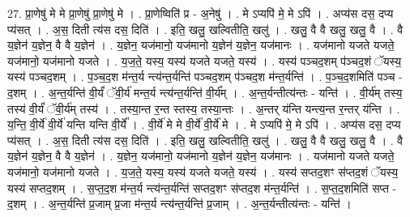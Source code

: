 \documentclass[17pt]{extarticle}
\begin{document}
27. प्रा॒णेषु॑ मे मे प्रा॒णेषु॑ प्रा॒णेषु॑ मे । . प्रा॒णेष्विति॑ प्र - अ॒नेषु॑ । . मे ऽप्यपि॑ मे॒ मे ऽपि॑ । . अप्य॑स दस॒ दप्य प्य॑सत् । . अ॒स॒ दिती त्य॑स दस॒ दिति॑ । . इति॒ खलु॒ खल्वितीति॒ खलु॑ । . खलु॒ वै वै खलु॒ खलु॒ वै । . वै य॒ज्ञेन॑ य॒ज्ञेन॒ वै वै य॒ज्ञेन॑ । . य॒ज्ञेन॒ यज॑मानो॒ यज॑मानो य॒ज्ञेन॑ य॒ज्ञेन॒ यज॑मानः । . यज॑मानो यजते यजते॒ यज॑मानो॒ यज॑मानो यजते । . य॒ज॒ते॒ यस्य॒ यस्य॑ यजते यजते॒ यस्य॑ । . यस्य॑ पञ्चद॒शम् प॑ञ्चद॒शं ॅयस्य॒ यस्य॑ पञ्चद॒शम् । . प॒ञ्च॒द॒श म॑न्त॒र्य न्त्य॑न्त॒र्यन्ति॑ पञ्चद॒शम् प॑ञ्चद॒श म॑न्त॒र्यन्ति॑ । . प॒ञ्च॒द॒शमिति॑ पञ्च - द॒शम् । . अ॒न्त॒र्यन्ति॑ वी॒र्यं॑ ॅवी॒र्य॑ मन्त॒र्य न्त्य॑न्त॒र्यन्ति॑ वी॒र्य᳚म् । . अ॒न्त॒र्यन्तीत्य॑न्तः - यन्ति॑ । . वी॒र्य॑म् तस्य॒ तस्य॑ वी॒र्यं॑ ॅवी॒र्य॑म् तस्य॑ । . तस्या॒न्त र॒न्त स्तस्य॒ तस्या॒न्तः । . अ॒न्तर् य॑न्ति यन्त्य॒न्त र॒न्तर् य॑न्ति । . य॒न्ति॒ वी॒र्ये॑ वी॒र्ये॑ यन्ति यन्ति वी॒र्ये᳚ । . वी॒र्ये॑ मे मे वी॒र्ये॑ वी॒र्ये॑ मे । . मे ऽप्यपि॑ मे॒ मे ऽपि॑ । . अप्य॑स दस॒ दप्य प्य॑सत् । . अ॒स॒ दिती त्य॑स दस॒ दिति॑ । . इति॒ खलु॒ खल्वितीति॒ खलु॑ । . खलु॒ वै वै खलु॒ खलु॒ वै । . वै य॒ज्ञेन॑ य॒ज्ञेन॒ वै वै य॒ज्ञेन॑ । . य॒ज्ञेन॒ यज॑मानो॒ यज॑मानो य॒ज्ञेन॑ य॒ज्ञेन॒ यज॑मानः । . यज॑मानो यजते यजते॒ यज॑मानो॒ यज॑मानो यजते । . य॒ज॒ते॒ यस्य॒ यस्य॑ यजते यजते॒ यस्य॑ । . यस्य॑ सप्तद॒शꣳ स॑प्तद॒शं ॅयस्य॒ यस्य॑ सप्तद॒शम् । . स॒प्त॒द॒श म॑न्त॒र्य न्त्य॑न्त॒र्यन्ति॑ सप्तद॒शꣳ स॑प्तद॒श म॑न्त॒र्यन्ति॑ । . स॒प्त॒द॒शमिति॑ सप्त - द॒शम् । . अ॒न्त॒र्यन्ति॑ प्र॒जाम् प्र॒जा म॑न्त॒र्य न्त्य॑न्त॒र्यन्ति॑ प्र॒जाम् । . अ॒न्त॒र्यन्तीत्य॑न्तः - यन्ति॑ । \newline
\end{document}
